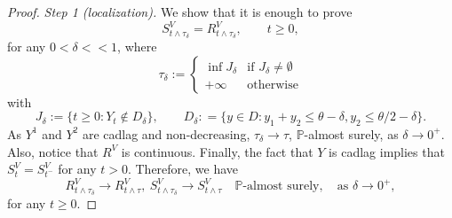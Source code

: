 \documentclass[10pt]{article}
\numberwithin{equation}{section}
\theoremstyle{plain}
\numberwithin{theorem}{section}
\theoremstyle{definition}
\newcommand{\<}{\langle}
\renewcommand{\>}{\rangle}
\renewcommand{\(}{\left(}
\renewcommand{\)}{\right)}
\newcommand\Pb{\mathbb{P}}
\begin{document}
{{{\begin{proof}
\emph{Step 1 (localization).} We show that it is enough to prove
\begin{equation}
S^V_{t\wedge \tau_{\delta}} = R^V_{t\wedge \tau_{\delta}} , \qquad t\geq 0, 
\label{eq:ito_ter}
\end{equation}
for any $0<\delta<<1$, where 
\begin{equation}\label{eq:tau_del}
\tau_{\delta}:=\begin{cases} 
\inf J_{\delta}& \text{if } J_{\delta} \neq \emptyset  \\
+\infty & \text{otherwise}
\end{cases}
\end{equation}
with
\begin{equation}
J_{\delta}:=  \{ t\geq 0 : Y_t \notin D_{\delta}\} , \qquad D_{\delta} : = \{y\in D : y_1+y_2 \leq \theta - \delta, y_2\leq \theta/2 - \delta \} .
\end{equation}
As $Y^1$ and $Y^2$ are cadlag and non-decreasing, $\tau_{\delta} \to \tau$, $\Pb$-almost surely, as $\delta \to 0^+$. Also, notice that $R^V$ is continuous. Finally, the fact that $Y$ is cadlag implies that $S^V_t = S^V_{t^-}$ for any $t> 0$. Therefore, we have
\begin{equation}%
R^V_{t\wedge \tau_{\delta}} \longrightarrow R^V_{t\wedge \tau} , \  S^V_{t\wedge \tau_{\delta}} \longrightarrow S^V_{t\wedge \tau} \quad \Pb\text{-almost surely},\quad \text{as } \delta\to 0^+,
\end{equation}
for any $t\geq 0$. 


\vspace{2pt}


\end{proof}}}}
\end{document}
